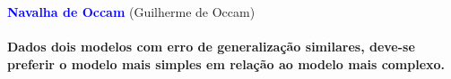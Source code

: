 \documentclass[12pt,ignorenonframetext,aspectratio=1610]{beamer}
\newenvironment{variableblock}[3]{%
  \setbeamercolor{block body}{#2}
  \setbeamercolor{block title}{#3}
  \begin{block}{#1}}{\end{block}}
\begin{document}

\begin{frame}[c]

\begin{center}

 \Large{\textcolor{blue}{\textbf{Navalha de Occam}}} (Guilherme de Occam) \\~\\
 
\textbf{Dados dois modelos com erro de generalização similares, deve-se preferir o modelo mais simples em relação ao modelo mais complexo.}
\end{center}

\end{frame}








\end{document}
